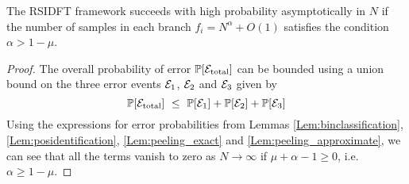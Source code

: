 \begin{theorem}
	The RSIDFT framework succeeds with high probability asymptotically in $N$ if the number of samples in each branch $f_i = N^{\alpha}+O(1)$ satisfies the condition $\alpha > 1-\mu$.
\end{theorem}
\begin{proof}
The overall probability of error $\mathbb{P}[\mathcal{E}_{\text{total}}]$ can be bounded using a union bound on the three error events $\mathcal{E}_1$, $\mathcal{E}_2$ and $\mathcal{E}_3$ given by  	$$
\mathbb{P}[\mathcal{E}_{\text{total}}] ~\leq~  \mathbb{P}[\mathcal{E}_1] +  \mathbb{P}[\mathcal{E}_2] + \mathbb{P}[\mathcal{E}_3]
$$
Using the expressions for error probabilities from Lemmas \ref{Lem:binclassification}, \ref{Lem:posidentification}, \ref{Lem:peeling_exact} and \ref{Lem:peeling_approximate}, we can see that all the terms vanish to zero as $N \rightarrow \infty$ if $\mu+\alpha-1 \geq 0$, i.e. $\alpha \geq 1-\mu$.
\end{proof}
